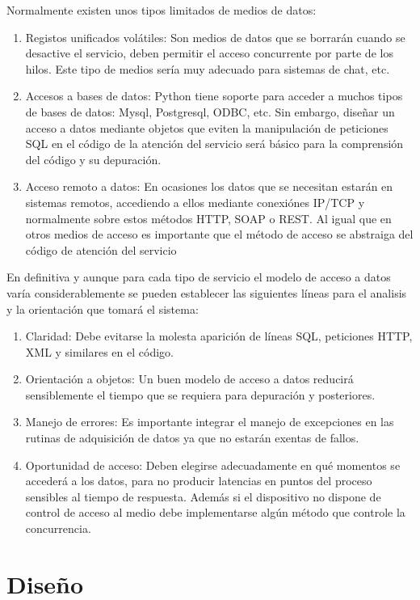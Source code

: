 \documentclass[a4paper,spanish,12pt]{book}
\begin{document}
Normalmente existen unos tipos limitados de medios de datos:
\begin{enumerate}
	\item{Registos unificados volátiles: Son medios de datos que se borrarán cuando se desactive el servicio, deben permitir el acceso concurrente por parte de los hilos. Este tipo de medios sería muy adecuado para sistemas de chat, etc.}
	\item{Accesos a bases de datos: Python tiene soporte para acceder a muchos tipos de bases de datos: Mysql, Postgresql, ODBC, etc. Sin embargo, diseñar un acceso a datos mediante objetos que eviten la manipulación de peticiones SQL en el código de la atención del servicio será básico para la comprensión del código y su depuración.}
	\item{Acceso remoto a datos: En ocasiones los datos que se necesitan estarán en sistemas remotos, accediendo a ellos mediante conexiónes IP/TCP y normalmente sobre estos m\'etodos HTTP, SOAP o REST. Al igual que en otros medios de acceso es importante que el m\'etodo de acceso se abstraiga del código de atención del servicio}
\end{enumerate}
En definitiva y aunque para cada tipo de servicio el modelo de acceso a datos varía considerablemente se pueden establecer las siguientes líneas para el analisis y la orientación que tomará el sistema:
\begin{enumerate}
	\item{Claridad: Debe evitarse la molesta aparición de líneas SQL, peticiones HTTP, XML y similares en el código.}
	\item{Orientación a objetos: Un buen modelo de acceso a datos reducirá sensiblemente el tiempo que se requiera para depuración y posteriores.}
	\item{Manejo de errores: Es importante integrar el manejo de excepciones en las rutinas de adquisición de datos ya que no estarán exentas de fallos.}
	\item{Oportunidad de acceso: Deben elegirse adecuadamente en qué momentos se accederá a los datos, para no producir latencias en puntos del proceso sensibles al tiempo de respuesta. Además si el dispositivo no dispone de control de acceso al medio debe implementarse algún m\'etodo que controle la concurrencia.}
	
\end{enumerate}

\section{Diseño}
\end{document}
